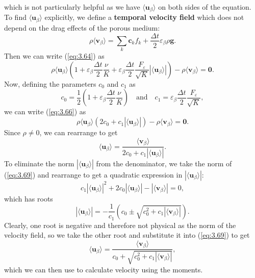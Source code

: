 \documentclass[a4paper, 11pt]{report}
\begin{document}
which is not particularly helpful as we have $\langle\mathbf{u}_\beta\rangle$ on both sides of the equation. To find $\langle\mathbf{u}_\beta\rangle$ explicitly, we define a \textbf{temporal velocity field} which does not depend on the drag effects of the porous medium: 
\begin{equation}
    \rho\langle\mathbf{v}_\beta\rangle = \sum_k\mathbf{c}_kf_k + \frac{\Delta t}{2}\varepsilon_\beta\rho\mathbf{g}. \label{eq:3.65}
\end{equation}
Then we can write (\ref{eq:3.64}) as
\begin{equation}
    \rho\langle\mathbf{u}_\beta\rangle\left(1 + \varepsilon_\beta\frac{\Delta t}{2}\frac{\nu}{K} + \varepsilon_\beta\frac{\Delta t}{2}\frac{F_\varepsilon}{\sqrt{K}}|\langle\mathbf{u}_\beta\rangle| \right)-\rho\langle\mathbf{v}_\beta\rangle = \mathbf{0}. \label{eq:3.66}
\end{equation}
Now, defining the parameters $c_0$ and $c_1$ as
\begin{equation}
    c_0 = \frac{1}{2}\left(1 + \varepsilon_\beta\frac{\Delta t}{2}\frac{\nu}{K}\right) \quad \text{and} \quad c_1 = \varepsilon_\beta\frac{\Delta t}{2}\frac{F_\varepsilon}{\sqrt{K}}, \label{eq:3.67}
\end{equation}
we can write (\ref{eq:3.66}) as
\begin{equation}
    \rho\langle\mathbf{u}_\beta\rangle\left(2c_0 + c_1|\langle\mathbf{u}_\beta\rangle|\right) - \rho\langle\mathbf{v}_\beta\rangle = \mathbf{0}. \label{eq:3.68}
\end{equation}
Since $\rho\neq0$, we can rearrange to get
\begin{equation}
    \langle\mathbf{u}_\beta\rangle = \frac{\langle\mathbf{v}_\beta\rangle}{2c_0 + c_1|\langle\mathbf{u}_\beta\rangle|}. \label{eq:3.69}
\end{equation}
To eliminate the norm $|\langle\mathbf{u}_\beta\rangle|$ from the denominator, we take the norm of (\ref{eq:3.69}) and rearrange to get a quadratic expression in $|\langle\mathbf{u}_\beta\rangle|$:
\begin{equation}
    c_1|\langle\mathbf{u}_\beta\rangle|^2 + 2c_0|\langle\mathbf{u}_\beta\rangle| - |\langle\mathbf{v}_\beta\rangle| = 0, \label{eq:3.70}
\end{equation}
which has roots
\begin{equation}
    |\langle\mathbf{u}_\beta\rangle| = -\frac{1}{c_1}\left(c_0\pm\sqrt{c_0^2 + c_1|\langle\mathbf{v}_\beta\rangle|}\right). \label{eq:3.71}
\end{equation}
Clearly, one root is negative and therefore not physical as the norm of the velocity field, so we take the other root and substitute it into (\ref{eq:3.69}) to get
\begin{equation}
    \langle\mathbf{u}_\beta\rangle = \frac{\langle\mathbf{v}_\beta\rangle}{c_0 + \sqrt{c_0^2 + c_1|\langle\mathbf{v}_\beta\rangle|}}, \label{eq:3.72}
\end{equation}
which we can then use to calculate velocity using the moments.
\end{document}
